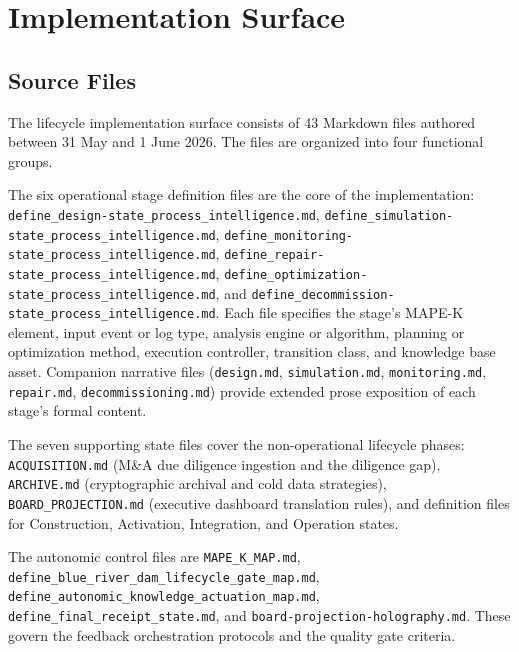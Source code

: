 
\section{Implementation Surface}
\label{sec:lifecycle-implementation}

\subsection{Source Files}
\label{sec:lifecycle-implementation-sources}

The lifecycle implementation surface consists of 43 Markdown files authored between
31 May and 1 June 2026. The files are organized into four functional groups.

The six operational stage definition files are the core of the implementation:
\texttt{define\_design-state\_process\_intelligence.md},
\texttt{define\_simulation-state\_process\_intelligence.md},
\texttt{define\_monitoring-state\_process\_intelligence.md},
\texttt{define\_repair-state\_process\_intelligence.md},
\texttt{define\_optimization-state\_process\_intelligence.md}, and
\texttt{define\_decommission-state\_process\_intelligence.md}. Each file specifies the
stage's MAPE-K element, input event or log type, analysis engine or algorithm, planning
or optimization method, execution controller, transition class, and knowledge base asset.
Companion narrative files (\texttt{design.md}, \texttt{simulation.md},
\texttt{monitoring.md}, \texttt{repair.md}, \texttt{decommissioning.md}) provide
extended prose exposition of each stage's formal content.

The seven supporting state files cover the non-operational lifecycle phases:
\texttt{ACQUISITION.md} (M\&A due diligence ingestion and the diligence gap),
\texttt{ARCHIVE.md} (cryptographic archival and cold data strategies),
\texttt{BOARD\_PROJECTION.md} (executive dashboard translation rules), and
definition files for Construction, Activation, Integration, and Operation states.

The autonomic control files are \texttt{MAPE\_K\_MAP.md},
\texttt{define\_blue\_river\_dam\_lifecycle\_gate\_map.md},
\texttt{define\_autonomic\_knowledge\_actuation\_map.md},
\texttt{define\_final\_receipt\_state.md}, and
\texttt{board-projection-holography.md}. These govern the feedback orchestration
protocols and the quality gate criteria.

